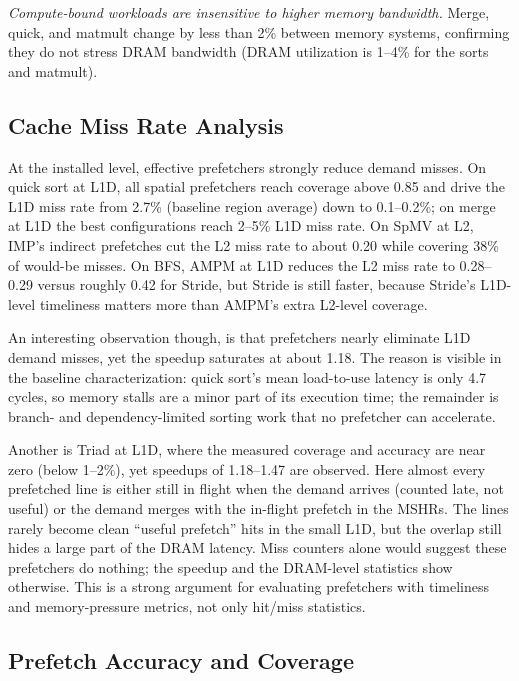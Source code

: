\documentclass[12pt, letterpaper]{article}
\begin{document}
\noindent\emph{Compute-bound workloads are insensitive to higher memory bandwidth.} Merge, quick, and matmult change by less than 2\% between memory systems, confirming they do not stress DRAM bandwidth (DRAM utilization is 1--4\% for the sorts and matmult).

\subsection{Cache Miss Rate Analysis}
\label{sec:res:miss-rate}


\noindent At the installed level, effective prefetchers strongly reduce demand misses. On quick sort at L1D, all spatial prefetchers reach coverage above 0.85 and drive the L1D miss rate from 2.7\% (baseline region average) down to 0.1--0.2\%; on merge at L1D the best configurations reach 2--5\% L1D miss rate. On SpMV at L2, IMP's indirect prefetches cut the L2 miss rate to about 0.20 while covering 38\% of would-be misses. On BFS, AMPM at L1D reduces the L2 miss rate to 0.28--0.29 versus roughly 0.42 for Stride, but Stride is still faster, because Stride's L1D-level timeliness matters more than AMPM's extra L2-level coverage.

\noindent An interesting observation though, is that prefetchers nearly eliminate L1D demand misses, yet the speedup saturates at about 1.18. The reason is visible in the baseline characterization: quick sort's mean load-to-use latency is only 4.7 cycles, so memory stalls are a minor part of its execution time; the remainder is branch- and dependency-limited sorting work that no prefetcher can accelerate.

\noindent Another is Triad at L1D, where the measured coverage and accuracy are near zero (below 1--2\%), yet speedups of 1.18--1.47 are observed. Here almost every prefetched line is either still in flight when the demand arrives (counted late, not useful) or the demand merges with the in-flight prefetch in the MSHRs. The lines rarely become clean ``useful prefetch'' hits in the small L1D, but the overlap still hides a large part of the DRAM latency. Miss counters alone would suggest these prefetchers do nothing; the speedup and the DRAM-level statistics show otherwise. This is a strong argument for evaluating prefetchers with timeliness and memory-pressure metrics, not only hit/miss statistics.

\subsection{Prefetch Accuracy and Coverage}
\label{sec:res:accuracy-coverage}
\end{document}
